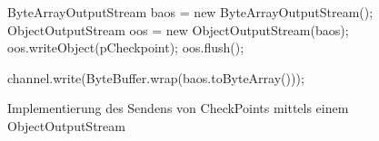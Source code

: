 \begin{figure}[h] 
    \centering
	\begin{spacing}{0.75}
		\begin{javacode}[firstnumber=45]
ByteArrayOutputStream baos = new ByteArrayOutputStream();
ObjectOutputStream oos = new ObjectOutputStream(baos);
oos.writeObject(pCheckpoint);
oos.flush();

channel.write(ByteBuffer.wrap(baos.toByteArray()));\end{javacode}
	\end{spacing}
	\caption{Implementierung des Sendens von CheckPoints mittels einem ObjectOutputStream}
\end{figure}